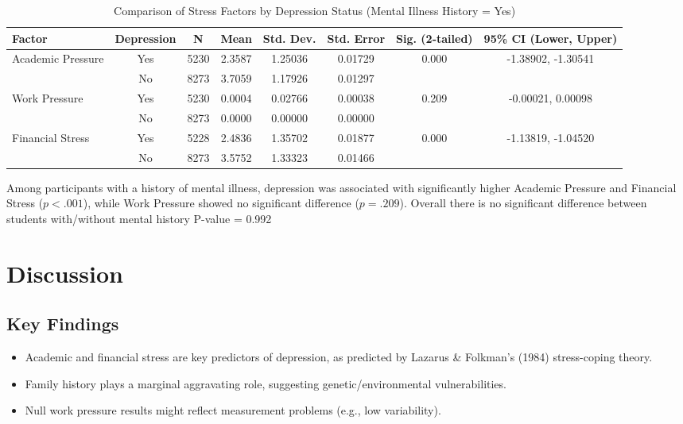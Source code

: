 \documentclass[conference]{IEEEtran}
\begin{document}
\begin{table*}[htbp]
\caption{Comparison of Stress Factors by Depression Status (Mental Illness History = Yes)}
\begin{center}
\begin{tabular}{|l|c|c|c|c|c|c|c|}
\hline
\textbf{Factor} & \textbf{Depression} & \textbf{N} & \textbf{Mean} & \textbf{Std. Dev.} & \textbf{Std. Error} & \textbf{Sig. (2-tailed)} & \textbf{95\% CI (Lower, Upper)} \\
\hline
\multirow{2}{*}{Academic Pressure} & Yes & 5230 & 2.3587 & 1.25036 & 0.01729 & \multirow{2}{*}{0.000} & -1.38902, -1.30541 \\
                                   & No  & 8273 & 3.7059 & 1.17926 & 0.01297 &                        &                     \\
\hline
\multirow{2}{*}{Work Pressure}     & Yes & 5230 & 0.0004 & 0.02766 & 0.00038 & \multirow{2}{*}{0.209} & -0.00021, 0.00098 \\
                                   & No  & 8273 & 0.0000 & 0.00000 & 0.00000 &                        &                    \\
\hline
\multirow{2}{*}{Financial Stress}  & Yes & 5228 & 2.4836 & 1.35702 & 0.01877 & \multirow{2}{*}{0.000} & -1.13819, -1.04520 \\
                                   & No  & 8273 & 3.5752 & 1.33323 & 0.01466 &                        &                   \\
\hline
\end{tabular}
\label{tab:depression_factors_mih_yes}
\end{center}
\vspace{-1em}
\begin{flushleft}
\footnotesize  Among participants with a history of mental illness, depression was associated with significantly higher Academic Pressure and Financial Stress ($p < .001$), while Work Pressure showed no significant difference ($p = .209$). Overall there is no significant difference between students with/without mental history P-value = 0.992
\end{flushleft}
\end{table*}

\section{Discussion}
\subsection{Key Findings}
\begin{itemize}
    \item Academic and financial stress are key predictors of depression, as predicted by Lazarus \& Folkman's (1984) stress-coping theory.
    \item Family history plays a marginal aggravating role, suggesting genetic/environmental vulnerabilities.
    \item Null work pressure results might reflect measurement problems (e.g., low variability).
\end{itemize}
\end{document}
